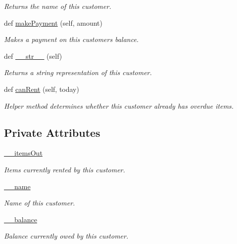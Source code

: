 \begin{DoxyCompactItemize}
\begin{DoxyCompactList}\small\item\em Returns the name of this customer. \end{DoxyCompactList}\item 
def \hyperlink{classCustomer_1_1Customer_a87070bd1a552dd094365dc4464253a3a}{make\+Payment} (self, amount)
\begin{DoxyCompactList}\small\item\em Makes a payment on this customer\textquotesingle{}s balance. \end{DoxyCompactList}\item 
def \hyperlink{classCustomer_1_1Customer_aa12655d57338586f1ee2a5c101d44356}{\+\_\+\+\_\+str\+\_\+\+\_\+} (self)
\begin{DoxyCompactList}\small\item\em Returns a string representation of this customer. \end{DoxyCompactList}\item 
def \hyperlink{classCustomer_1_1Customer_ad2f1246cd764010c5701930f6576f5e0}{can\+Rent} (self, today)
\begin{DoxyCompactList}\small\item\em Helper method determines whether this customer already has overdue items. \end{DoxyCompactList}\end{DoxyCompactItemize}
\subsection*{Private Attributes}
\begin{DoxyCompactItemize}
\item 
\hyperlink{classCustomer_1_1Customer_a573f55a71c994b6881a99fe055e9e1c2}{\+\_\+\+\_\+items\+Out}
\begin{DoxyCompactList}\small\item\em Items currently rented by this customer. \end{DoxyCompactList}\item 
\hyperlink{classCustomer_1_1Customer_a400a0ef109352dbf3f843006f22e611f}{\+\_\+\+\_\+name}
\begin{DoxyCompactList}\small\item\em Name of this customer. \end{DoxyCompactList}\item 
\hyperlink{classCustomer_1_1Customer_a3fe2716ffce15422d3bebc6989a1353d}{\+\_\+\+\_\+balance}
\begin{DoxyCompactList}\small\item\em Balance currently owed by this customer. \end{DoxyCompactList}\end{DoxyCompactItemize}


